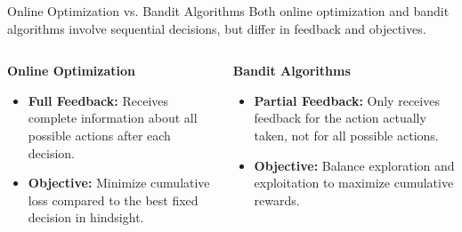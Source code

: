 \documentclass{beamer}
\begin{document}
\begin{frame}{Online Optimization vs. Bandit Algorithms}
    Both online optimization and bandit algorithms involve sequential decisions, but differ in feedback and objectives.
    \begin{columns}[T]
        \begin{column}{0.48\textwidth}
            \textbf{Online Optimization}
            \begin{itemize}
                \item \textbf{Full Feedback:} Receives complete information about all possible actions after each decision.
                \item \textbf{Objective:} Minimize cumulative loss compared to the best fixed decision in hindsight.
            \end{itemize}
        \end{column}
        \hfill
        \begin{column}{0.48\textwidth}
            \textbf{Bandit Algorithms}
            \begin{itemize}
                \item \textbf{Partial Feedback:} Only receives feedback for the action actually taken, not for all possible actions.
                \item \textbf{Objective:} Balance exploration and exploitation to maximize cumulative rewards.
            \end{itemize}
        \end{column}
    \end{columns}
\end{frame}
\end{document}
